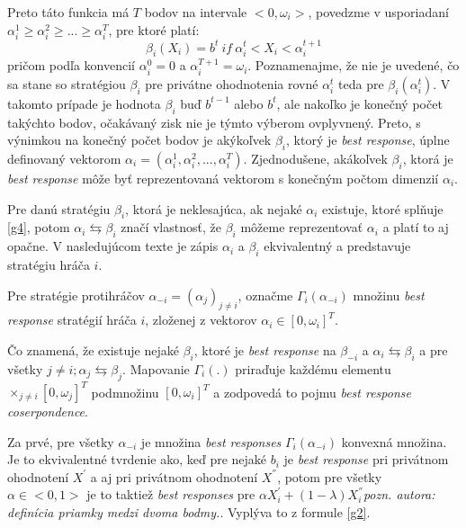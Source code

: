 \documentclass[a4paper, 11pt]{article}
\begin{document}
Preto táto funkcia má $T$ bodov na intervale $<0,\omega_{i}>$, povedzme v usporiadaní $\alpha_{i}^{1} \geq \alpha_{i}^{2} \geq ... \geq \alpha_{i}^{T}$, pre ktoré platí:
\begin{equation}
\label{g4}
\beta_{i}(X_{i}) = b^{t}\ if\ \alpha_{i}^{t} < X_{i} < \alpha_{i}^{t+1}
\end{equation}
pričom podľa konvencií $\alpha_{i}^{0} = 0$ a $\alpha_{i}^{T+1} = \omega_{i}$. Poznamenajme, že nie je uvedené, čo sa stane so stratégiou $\beta_{i}$ pre privátne ohodnotenia rovné $\alpha_{i}^{t}$ teda pre $\beta_{i}(\alpha_{i}^{t})$. V takomto prípade je hodnota $\beta_{i}$ buď $b^{t-1}$ alebo $b^{t}$, ale nakoľko je konečný počet takýchto bodov, očakávaný zisk nie je týmto výberom ovplyvnený. Preto, s výnimkou na konečný počet bodov je akýkoľvek $\beta_{i}$, ktorý je \textit{best response}, úplne definovaný vektorom $\alpha_{i} = (\alpha_{i}^{1},\alpha_{i}^{2},...,\alpha_{i}^{T})$. Zjednodušene, akákoľvek $\beta_{i}$, ktorá je \textit{best response} môže byť reprezentovaná vektorom s konečným počtom dimenzií $\alpha_{i}$.

Pre danú stratégiu $\beta_{i}$, ktorá je neklesajúca, ak nejaké $\alpha_{i}$ existuje, ktoré splňuje \ref{g4}, potom $\alpha_{i} \leftrightarrows \beta_{i}$ značí vlastnosť, že $\beta_{i}$ môžeme reprezentovať $\alpha_{i}$ a platí to aj opačne. V nasledujúcom texte je zápis $\alpha_{i}$ a $\beta_{i}$ ekvivalentný a predstavuje stratégiu hráča $i$.

Pre stratégie protihráčov $\alpha_{-i} = (\alpha_{j})_{j \ne i}$, označme $\Gamma_{i}(\alpha_{-i})$ množinu \textit{best response} stratégií hráča $i$, zloženej z vektorov $\alpha_{i} \in [0,\omega_{i}]^{T}$. 

Čo znamená, že existuje nejaké $\beta_{i}$, ktoré je \textit{best response} na $\beta_{-i}$ a $\alpha_{i}  \leftrightarrows \beta_{i}$ a pre všetky $j \ne i; \alpha_{j} \leftrightarrows \beta_{j}$. Mapovanie $\Gamma_{i}(.)$ priraďuje každému elementu $\times_{j \ne i}[0,\omega_{j}]^{T}$ podmnožinu $[0,\omega_{i}]^{T}$ a zodpovedá to pojmu \textit{best response coserpondence}.

Za prvé, pre všetky $\alpha_{-i}$ je množina \textit{best responses} $\Gamma_{i}(\alpha_{-i})$ konvexná množina.  Je to ekvivalentné tvrdenie ako, keď pre nejaké $b_{i}$ je \textit{best response} pri privátnom ohodnotení $X^{'}$ a aj pri privátnom ohodnotení $X^{''}$, potom pre všetky $\alpha \in <0,1>$ je to taktiež \textit{best responses} pre $\alpha X^{'}_{i} + (1 - \lambda)X_{i}^{''}$\textit{pozn. autora: definícia priamky medzi dvoma bodmy.}. Vyplýva to z formule \ref{g2}.
\end{document}
